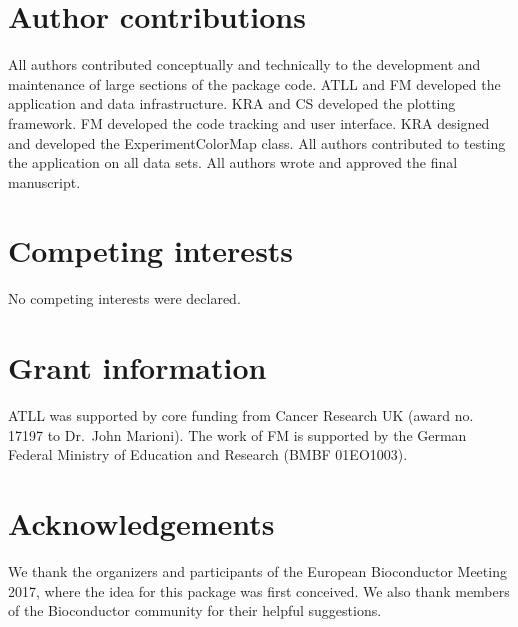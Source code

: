 \documentclass[10pt,a4paper,twocolumn]{article}
\begin{document}
\section*{Author contributions}
All authors contributed conceptually and technically to the development and maintenance of large sections of the package code.
ATLL and FM developed the application and data infrastructure.
KRA and CS developed the plotting framework.
FM developed the code tracking and user interface.
KRA designed and developed the ExperimentColorMap class.
All authors contributed to testing the application on all data sets.
All authors wrote and approved the final manuscript.

\section*{Competing interests}
No competing interests were declared.

\section*{Grant information}
ATLL was supported by core funding from Cancer Research UK (award no. 17197 to Dr.\ John Marioni).
The work of FM is supported by the German Federal Ministry of Education and Research (BMBF 01EO1003).

\section*{Acknowledgements}
We thank the organizers and participants of the European Bioconductor Meeting 2017, where the idea for this package was first conceived.
We also thank members of the Bioconductor community for their helpful suggestions.

{\small
}

\bigskip





\end{document}
